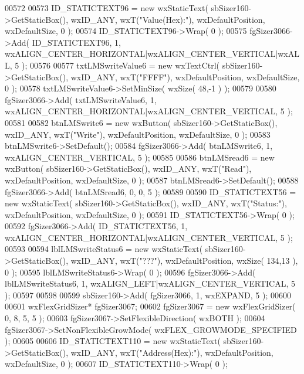 \begin{DoxyCode}
00572     
00573     ID_STATICTEXT96 = \textcolor{keyword}{new} wxStaticText( sbSizer160->GetStaticBox(), wxID\_ANY, wxT(\textcolor{stringliteral}{"Value(Hex):"}), 
      wxDefaultPosition, wxDefaultSize, 0 );
00574     ID_STATICTEXT96->Wrap( 0 );
00575     fgSizer3066->Add( ID_STATICTEXT96, 1, wxALIGN\_CENTER\_HORIZONTAL|wxALIGN\_CENTER\_VERTICAL|wxALL, 5 );
00576     
00577     txtLMSwriteValue6 = \textcolor{keyword}{new} wxTextCtrl( sbSizer160->GetStaticBox(), wxID\_ANY, wxT(\textcolor{stringliteral}{"FFFF"}), 
      wxDefaultPosition, wxDefaultSize, 0 );
00578     txtLMSwriteValue6->SetMinSize( wxSize( 48,-1 ) );
00579     
00580     fgSizer3066->Add( txtLMSwriteValue6, 1, wxALIGN\_CENTER\_HORIZONTAL|wxALIGN\_CENTER\_VERTICAL, 5 );
00581     
00582     btnLMSwrite6 = \textcolor{keyword}{new} wxButton( sbSizer160->GetStaticBox(), wxID\_ANY, wxT(\textcolor{stringliteral}{"Write"}), wxDefaultPosition, 
      wxDefaultSize, 0 );
00583     btnLMSwrite6->SetDefault(); 
00584     fgSizer3066->Add( btnLMSwrite6, 1, wxALIGN\_CENTER\_VERTICAL, 5 );
00585     
00586     btnLMSread6 = \textcolor{keyword}{new} wxButton( sbSizer160->GetStaticBox(), wxID\_ANY, wxT(\textcolor{stringliteral}{"Read"}), wxDefaultPosition, 
      wxDefaultSize, 0 );
00587     btnLMSread6->SetDefault(); 
00588     fgSizer3066->Add( btnLMSread6, 0, 0, 5 );
00589     
00590     ID_STATICTEXT56 = \textcolor{keyword}{new} wxStaticText( sbSizer160->GetStaticBox(), wxID\_ANY, wxT(\textcolor{stringliteral}{"Status:"}), 
      wxDefaultPosition, wxDefaultSize, 0 );
00591     ID_STATICTEXT56->Wrap( 0 );
00592     fgSizer3066->Add( ID_STATICTEXT56, 1, wxALIGN\_CENTER\_HORIZONTAL|wxALIGN\_CENTER\_VERTICAL, 5 );
00593     
00594     lblLMSwriteStatus6 = \textcolor{keyword}{new} wxStaticText( sbSizer160->GetStaticBox(), wxID\_ANY, wxT(\textcolor{stringliteral}{"???"}), 
      wxDefaultPosition, wxSize( 134,13 ), 0 );
00595     lblLMSwriteStatus6->Wrap( 0 );
00596     fgSizer3066->Add( lblLMSwriteStatus6, 1, wxALIGN\_LEFT|wxALIGN\_CENTER\_VERTICAL, 5 );
00597     
00598     
00599     sbSizer160->Add( fgSizer3066, 1, wxEXPAND, 5 );
00600     
00601     wxFlexGridSizer* fgSizer3067;
00602     fgSizer3067 = \textcolor{keyword}{new} wxFlexGridSizer( 0, 8, 5, 5 );
00603     fgSizer3067->SetFlexibleDirection( wxBOTH );
00604     fgSizer3067->SetNonFlexibleGrowMode( wxFLEX\_GROWMODE\_SPECIFIED );
00605     
00606     ID_STATICTEXT110 = \textcolor{keyword}{new} wxStaticText( sbSizer160->GetStaticBox(), wxID\_ANY, wxT(\textcolor{stringliteral}{"Address(Hex):"}), 
      wxDefaultPosition, wxDefaultSize, 0 );
00607     ID_STATICTEXT110->Wrap( 0 );

\end{DoxyCode}
